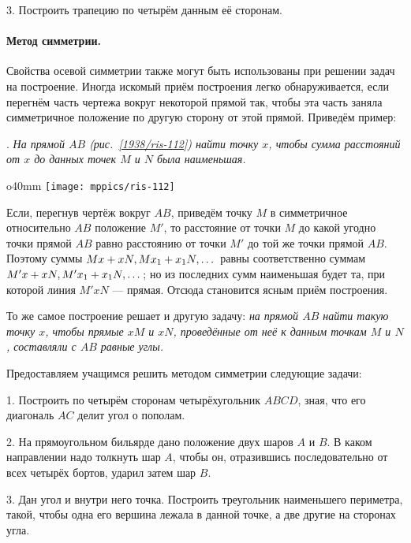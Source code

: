 {3.
Построить трапецию по четырём данным её сторонам.

\paragraph{Метод симметрии.}\label{1938/102}
Свойства осевой симметрии также могут быть использованы при решении задач на построение.
Иногда искомый приём построения легко обнаруживается, если перегнём часть чертежа вокруг некоторой прямой так, чтобы эта часть заняла симметричное положение по другую сторону от этой прямой.
Приведём пример:

\smallskip
{}.
\emph{На прямой $AB$ \emph{(рис.~\ref{1938/ris-112})} найти точку $x$, чтобы сумма расстояний от $x$ до данных точек $M$ и $N$ была наименьшая.}

\begin{wrapfigure}{o}{40mm}
\vskip-0mm
\centering
\texttt{[image: mppics/ris-112]}
\caption{}\label{1938/ris-112}
\end{wrapfigure}

Если, перегнув чертёж вокруг $AB$, приведём точку $M$ в симметричное относительно $AB$ положение $M'$, то расстояние от точки $M$ до какой угодно точки прямой $AB$ равно расстоянию от точки $M'$ до той же точки прямой $AB$.
Поэтому суммы $Mx\z+xN,  Mx_1\z+x_1N,\dots $ равны соответственно суммам $M'x+xN, M'x_1\z+x_1N, \dots$;
но из последних сумм наименьшая будет та, при которой линия $M'xN$ — прямая.
Отсюда становится ясным приём построения.

То же самое построение решает и другую задачу:
\emph{на прямой $AB$ найти такую точку $x$, чтобы прямые $xM$ и $xN$, проведённые от неё к данным точкам $M$ и $N$, составляли с $AB$ равные углы.}

Предоставляем учащимся решить методом симметрии следующие задачи:

\medskip

1.
Построить по четырём сторонам четырёхугольник $ABCD$, зная, что его диагональ $AC$ делит угол о пополам.

2.
На прямоугольном бильярде дано положение двух шаров $A$ и $B$.
В каком направлении надо толкнуть шар $A$, чтобы он, отразившись последовательно от всех четырёх бортов, ударил затем шар $B$.

3.
Дан угол и внутри него точка.
Построить треугольник наименьшего периметра, такой, чтобы одна его вершина лежала в данной точке, а две другие на сторонах угла.

}

